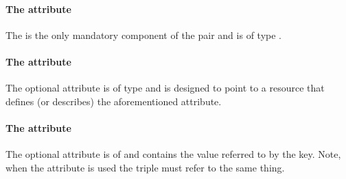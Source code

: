 
\paragraph{The  attribute}
The  is the only mandatory component of the \KeyValue pair and is of type .

\paragraph{The  attribute}
The optional attribute  is of type  and is designed to point to a resource that defines (or describes) the aforementioned  attribute.

\paragraph{The  attribute}
The optional  attribute is of  and contains the value referred to by the key. Note, when the  attribute is used the triple must refer to the same thing.


